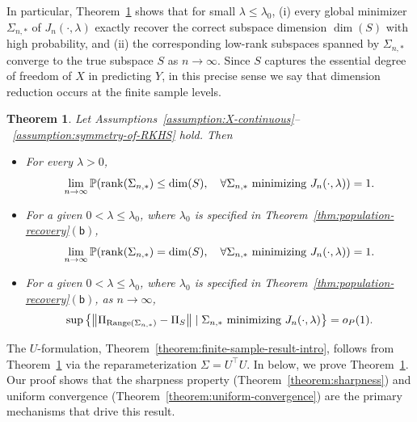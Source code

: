 \documentclass[sn-mathphys-num]{sn-jnl}%
\numberwithin{equation}{section}
\newcommand{\norm}[1]{\left\|{#1}\right\|} %
\renewcommand{\P}{\mathbb{P}}
\newcommand{\Range}{{\rm Range}}
\newcommand{\rank}{{\rm rank}}
\theoremstyle{thmstyleone}%
\newtheorem{theorem}{Theorem}%
\theoremstyle{thmstyletwo}%
\theoremstyle{thmstylethree}%
\begin{document}
In particular, Theorem~\ref{thm:finite-sample-recovery} shows that for small $\lambda \le \lambda_0$, (i) every global minimizer 
$\Sigma_{n,*}$ of $J_n(\cdot, \lambda)$ exactly recover the correct subspace dimension $\dim(S)$ 
with high probability, and (ii) the corresponding low-rank subspaces spanned by $\Sigma_{n,*}$ 
converge to the true subspace $S$ as $n \to \infty$. Since $S$ captures the essential degree of freedom
of $X$ in predicting $Y$, in this precise sense we say that dimension reduction occurs at the finite sample levels.


\vspace{.5em} 
\begin{theorem}
\label{thm:finite-sample-recovery}
Let Assumptions~\ref{assumption:X-continuous}--~\ref{assumption:symmetry-of-RKHS} 
hold.  Then \vspace{.5em} 
\begin{itemize}
\item[$\mathsf{(a)}$] 
For every $\lambda > 0$, 
\begin{equation*}
	\lim_{n \to \infty} \P( \rank(\Sigma_{n, *}) \le \dim(S),~~~\forall \Sigma_{n, *}~\text{minimizing}~J_n(\cdot, \lambda)) = 1.
\end{equation*}
\item[$\mathsf{(b)}$] 
For a given $0 < \lambda \le \lambda_0$, where $\lambda_0$ is specified in Theorem~\ref{thm:population-recovery}$\mathsf{(b)}$, 
\begin{equation*}
	\lim_{n \to \infty} \P( \rank(\Sigma_{n, *}) = \dim(S),~~~\forall \Sigma_{n, *}~\text{minimizing}~J_n(\cdot, \lambda)) = 1.
\end{equation*} 
\item[$\mathsf{(c)}$] 
For a given $0 < \lambda \le \lambda_0$, where $\lambda_0$ is specified in Theorem~\ref{thm:population-recovery}$\mathsf{(b)}$, as $n \to \infty$,
\begin{equation*}
	\sup\left\{\norm{\Pi_{\Range(\Sigma_{n, *})}- \Pi_S} \mid \Sigma_{n, *}~\text{minimizing}~J_n(\cdot, \lambda) \right\} = o_P(1).
\end{equation*}  
\end{itemize}
\end{theorem} 
The $U$-formulation, Theorem~\ref{theorem:finite-sample-result-intro}, follows from Theorem~\ref{thm:finite-sample-recovery} via the reparameterization $\Sigma = U^\top U$.
In below, we prove Theorem~\ref{thm:finite-sample-recovery}. Our proof shows that the
sharpness property (Theorem~\ref{theorem:sharpness}) and uniform convergence (Theorem~\ref{theorem:uniform-convergence}) 
are the primary mechanisms that drive this result. 
\end{document}
